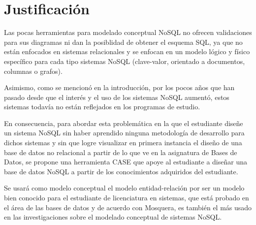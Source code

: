 \section{Justificación}

Las pocas herramientas para modelado conceptual NoSQL no ofrecen validaciones para sus diagramas ni dan la posiblidad de obtener el esquema SQL, ya que no están enfocados en sistemas relacionales y se enfocan en un modelo lógico y físico específico para cada tipo sistemas NoSQL (clave-valor, orientado a documentos, columnas o grafos).


Asimismo, como se mencionó en la introducción, por los pocos años que han pasado desde que el interés y el uso de los sistemas NoSQL aumentó, estos sistemas todavía no están reflejados en los programas de estudio.


En consecuencia, para abordar esta problemática en la que el estudiante diseñe un sistema NoSQL sin haber aprendido ninguna metodología de desarrollo para dichos sistemas y sin que logre visualizar en primera instancia el diseño de una base de datos no relacional a partir de lo que ve en la asignatura de Bases de Datos, se propone una herramienta CASE que apoye al estudiante a diseñar una base de datos NoSQL a partir de los conocimientos adquiridos del estudiante.


Se usará como modelo conceptual el modelo entidad-relación por ser un modelo bien conocido para el estudiante de licenciatura en sistemas, que está probado en el área de las bases de datos y de acuerdo con Mosquera\cite{martinez-mosquera_modeling_2020}, es también el más usado en las investigaciones sobre el modelado conceptual de sistemas NoSQL.

